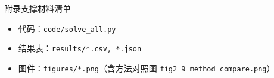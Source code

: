 \documentclass[fontset=windows, UTF8, 12pt, a4paper]{ctexart}
\begin{document}
\clearpage
{}
{}
\begin{center}{\fontsize{15pt}{20pt}\heiti 附录\quad 支撑材料清单}\end{center}
\vspace{0.6em}
\begin{itemize}
  \item 代码：\texttt{code/solve\_all.py}
  \item 结果表：\texttt{results/*.csv, *.json}
  \item 图件：\texttt{figures/*.png}（含方法对照图 \texttt{fig2\_9\_method\_compare.png}）
\end{itemize}
\end{document}
